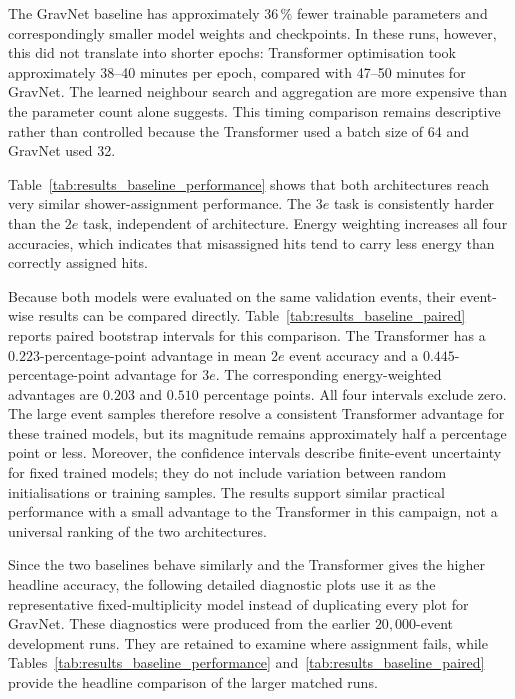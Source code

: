 

The GravNet baseline has approximately \(36\,\%\) fewer trainable parameters
and correspondingly smaller model weights and checkpoints. In these runs,
however, this did not translate into shorter epochs: Transformer optimisation
took approximately 38--40 minutes per epoch, compared with 47--50 minutes for
GravNet. The learned neighbour search and aggregation are more expensive than
the parameter count alone suggests. This timing comparison remains
descriptive rather than controlled because the Transformer used a batch size
of 64 and GravNet used 32.

Table~\ref{tab:results_baseline_performance} shows that both architectures
reach very similar shower-assignment performance. The \(3e\) task is
consistently harder than the \(2e\) task, independent of architecture. Energy
weighting increases all four accuracies, which indicates that misassigned
hits tend to carry less energy than correctly assigned hits.



Because both models were evaluated on the same validation events, their
event-wise results can be compared directly. Table~\ref{tab:results_baseline_paired}
reports paired bootstrap intervals for this comparison. The Transformer has a
\(0.223\)-percentage-point advantage in mean \(2e\) event accuracy and a
\(0.445\)-percentage-point advantage for \(3e\). The corresponding
energy-weighted advantages are \(0.203\) and \(0.510\) percentage points. All
four intervals exclude zero. The large event samples therefore resolve a
consistent Transformer advantage for these trained models, but its magnitude
remains approximately half a percentage point or less. Moreover, the
confidence intervals describe finite-event uncertainty for fixed trained
models; they do not include variation between random initialisations or
training samples. The results support similar practical performance with a
small advantage to the Transformer in this campaign, not a universal ranking
of the two architectures.



Since the two baselines behave similarly and the Transformer gives the higher
headline accuracy, the following detailed diagnostic plots use it as the
representative fixed-multiplicity model instead of duplicating every plot for
GravNet. These diagnostics were produced from the earlier
\(20{,}000\)-event development runs. They are retained to examine where
assignment fails, while Tables~\ref{tab:results_baseline_performance}
and~\ref{tab:results_baseline_paired} provide the headline comparison of the
larger matched runs.




